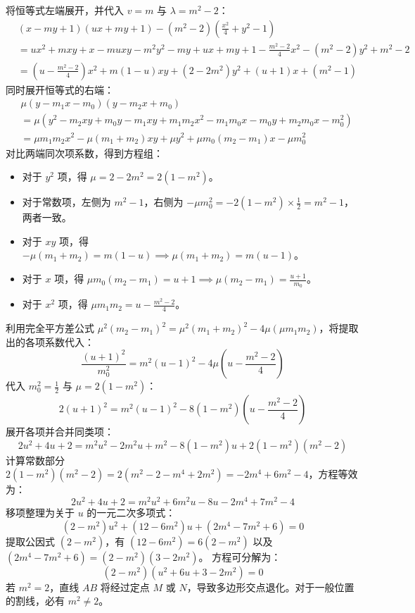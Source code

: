 \begin{solution}
将恒等式左端展开，并代入 $v = m$ 与 $\lambda = m^2 - 2$：
\begin{align*}
& (x - my + 1)(ux + my + 1) - (m^2 - 2)\left(\frac{x^2}{4} + y^2 - 1\right) \\
&= u x^2 + m xy + x - mu xy - m^2 y^2 - my + ux + my + 1 - \frac{m^2 - 2}{4} x^2 - (m^2 - 2)y^2 + m^2 - 2 \\
&= \left(u - \frac{m^2 - 2}{4}\right) x^2 + m(1 - u) xy + (2 - 2m^2) y^2 + (u + 1)x + (m^2 - 1)
\end{align*}
同时展开恒等式的右端：
\begin{align*}
& \mu(y - m_1 x - m_0)(y - m_2 x + m_0) \\
&= \mu \left( y^2 - m_2 xy + m_0 y - m_1 xy + m_1 m_2 x^2 - m_1 m_0 x - m_0 y + m_2 m_0 x - m_0^2 \right) \\
&= \mu m_1 m_2 x^2 - \mu(m_1 + m_2) xy + \mu y^2 + \mu m_0(m_2 - m_1)x - \mu m_0^2
\end{align*}
对比两端同次项系数，得到方程组：
\begin{itemize}
\item 对于 $y^2$ 项，得 $\mu = 2 - 2m^2 = 2(1 - m^2)$。
\item 对于常数项，左侧为 $m^2 - 1$，右侧为 $-\mu m_0^2 = -2(1 - m^2) \times \frac{1}{2} = m^2 - 1$，两者一致。
\item 对于 $xy$ 项，得 $-\mu(m_1 + m_2) = m(1 - u) \implies \mu(m_1 + m_2) = m(u - 1)$。
\item 对于 $x$ 项，得 $\mu m_0(m_2 - m_1) = u + 1 \implies \mu(m_2 - m_1) = \frac{u + 1}{m_0}$。
\item 对于 $x^2$ 项，得 $\mu m_1 m_2 = u - \frac{m^2 - 2}{4}$。
\end{itemize}
利用完全平方差公式 $\mu^2 (m_2 - m_1)^2 = \mu^2 (m_1 + m_2)^2 - 4\mu(\mu m_1 m_2)$，将提取出的各项系数代入：
$$ \frac{(u + 1)^2}{m_0^2} = m^2 (u - 1)^2 - 4\mu \left(u - \frac{m^2 - 2}{4}\right) $$
代入 $m_0^2 = \frac{1}{2}$ 与 $\mu = 2(1 - m^2)$：
$$ 2(u + 1)^2 = m^2 (u - 1)^2 - 8(1 - m^2)\left(u - \frac{m^2 - 2}{4}\right) $$
展开各项并合并同类项：
$$ 2u^2 + 4u + 2 = m^2 u^2 - 2m^2 u + m^2 - 8(1 - m^2)u + 2(1 - m^2)(m^2 - 2) $$
计算常数部分 $2(1 - m^2)(m^2 - 2) = 2(m^2 - 2 - m^4 + 2m^2) = -2m^4 + 6m^2 - 4$，方程等效为：
$$ 2u^2 + 4u + 2 = m^2 u^2 + 6m^2 u - 8u - 2m^4 + 7m^2 - 4 $$
移项整理为关于 $u$ 的一元二次多项式：
$$ (2 - m^2)u^2 + (12 - 6m^2)u + (2m^4 - 7m^2 + 6) = 0 $$
提取公因式 $(2 - m^2)$，有 $(12 - 6m^2) = 6(2 - m^2)$ 以及 $(2m^4 - 7m^2 + 6) = (2 - m^2)(3 - 2m^2)$。
方程可分解为：
$$ (2 - m^2)(u^2 + 6u + 3 - 2m^2) = 0 $$
若 $m^2 = 2$，直线 $AB$ 将经过定点 $M$ 或 $N$，导致多边形交点退化。对于一般位置的割线，必有 $m^2 \neq 2$。

\end{solution}
